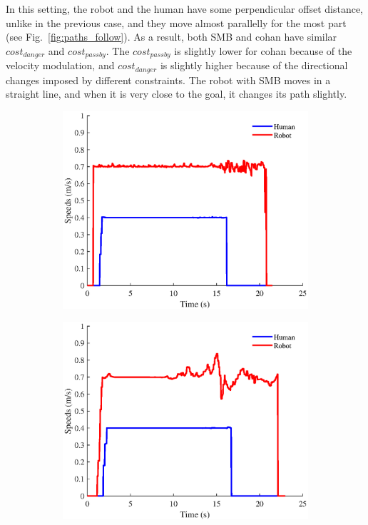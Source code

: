 In this setting, the robot and the human have some perpendicular offset distance, unlike in the previous case, and they move almost parallelly for the most part (see Fig.~\ref{fig:paths_follow}). As a result, both SMB and \acrshort{cohan} have similar $cost_{danger}$ and $cost_{passby}$. The $cost_{passby}$ is slightly lower for \acrshort{cohan} because of the velocity modulation, and $cost_{danger}$ is slightly higher because of the directional changes imposed by different constraints. The robot with SMB moves in a straight line, and when it is very close to the goal, it changes its path slightly. 

\begin{figure}[h!]
\centering
\hspace{-0.15cm}
\begin{subfigure}{.5\columnwidth}
  \includegraphics[width=\textwidth]{images/chapter6/smb/overtake_vel.eps}
\end{subfigure}
\hspace{-0.75cm}
\begin{subfigure}{.5\columnwidth}
  \includegraphics[width=\textwidth]{images/chapter6/cohan/overtake_vel.eps}

\end{subfigure}
\end{figure}
